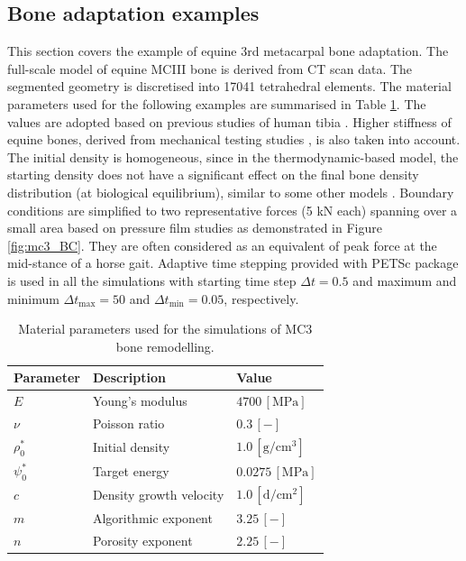 \documentclass[11pt]{ACMEarticle}
\numberwithin{equation}{section}
\begin{document}
\subsection{Bone adaptation examples}
\label{sec:numerical_examples:bone_adap}
This section covers the example of equine 3rd metacarpal bone adaptation. The full-scale model of equine MCIII bone is derived from CT scan data. The segmented geometry is discretised into 17041 tetrahedral elements. The material parameters used for the following examples are summarised in Table \ref{tab:parameters_mc3}. The values are adopted based on previous studies of human tibia \citep{Pang2012,Waffenschmidt2012}. Higher stiffness of equine bones, derived from mechanical testing studies \citep{Les1994}, is also taken into account. The initial density is homogeneous, since in the thermodynamic-based model, the starting density does not have a significant effect on the final bone density distribution (at biological equilibrium), similar to some other models \citep{kuhl2003theory}. %
Boundary conditions are simplified to two representative forces (5 kN each) spanning over a small area based on pressure film studies \citep{Brama2001} as demonstrated in Figure \ref{fig:mc3_BC}. They are often considered as an equivalent of peak force at the mid-stance of a horse gait. %
Adaptive time stepping provided with PETSc package \citep{petsc-web} is used in all the simulations with starting time step $\Delta t = 0.5$ and maximum and minimum $\Delta t_{\text {max}} = 50$ and $\Delta t_{\text {min}} = 0.05$, respectively.
\begin{table}[h]
	\centering
	\begin{tabular}{lll}
		\hline
		Parameter             & Description                  & Value  \\ \hline
		$E  $                 & Young's modulus              & $4700 \,\mathrm{ [MPa]}$  \citep{Les1994} \\
		$\nu  $               & Poisson ratio                & $0.3 \,\mathrm{ [-]}$ \\
		$\rho_0 ^\ast  $      & Initial density              & $1.0 \,\mathrm{[ g/cm^{3}]}$  \\
		$\psi_{0}^\ast $      & Target energy                & $0.0275\,\mathrm{ [MPa]}$   \citep{Waffenschmidt2012}  \\
		$c$                   & Density growth velocity      & $1.0 \,\mathrm{ [d/cm^{2}]}$   \\
		$m$                   & Algorithmic exponent         & $ 3.25 \,\mathrm{ [-]}$          \\
		$n$                   & Porosity exponent            & $2.25 \,\mathrm{ [-]}$      \citep{Les1994}   \\ 
		\hline
	\end{tabular} 
	\caption{Material parameters used for the simulations of MC3 bone remodelling.}
	\label{tab:parameters_mc3}
\end{table}
\end{document}
